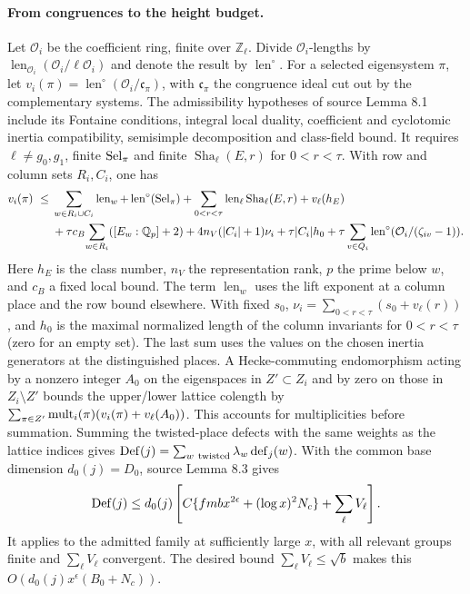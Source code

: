 \documentclass[letterpaper,11pt]{article}
\newcommand{\QQ}{\mathbb Q}
\newcommand{\ZZ}{\mathbb Z}
\newcommand{\Sha}{\operatorname{Sha}}
\newcommand{\len}{\operatorname{len}}
\begin{document}
\paragraph{From congruences to the height budget.}
Let \(\mathcal O_i\) be the coefficient ring, finite over \(\ZZ_\ell\). Divide \(\mathcal O_i\)-lengths by \(\len_{\mathcal O_i}(\mathcal O_i/\ell\mathcal O_i)\) and denote the result by \(\len^\circ\). For a selected eigensystem \(\pi\), let \(v_i(\pi)=\len^\circ(\mathcal O_i/\mathfrak c_\pi)\), with \(\mathfrak c_\pi\) the congruence ideal cut out by the complementary systems. The admissibility hypotheses of source Lemma 8.1 include its Fontaine conditions, integral local duality, coefficient and cyclotomic inertia compatibility, semisimple decomposition and class-field bound. It requires \(\ell\ne g_0,g_1\), finite \({\rm Sel}_\pi\) and finite \(\Sha_\ell(E,r)\) for \(0<r<\tau\). With row and column sets \(R_i,C_i\), one has
\begin{align*}
 v_i(\pi)\ \le{}&
 \sum_{w\in R_i\cup C_i}\len_w+\len^\circ({\rm Sel}_\pi)
 +\sum_{0<r<\tau}\len_\ell\Sha_\ell(E,r)+v_\ell(h_E)\\
 &+\tau c_B\!\sum_{w\in R_i}([E_w:\QQ_p]+2)
 +4n_V(|C_i|+1)\nu_i+\tau |C_i|h_0
 +\tau\sum_{v\in Q_i}\len^\circ(\mathcal O_i/(\zeta_{iv}-1)).
\end{align*}
Here \(h_E\) is the class number, \(n_V\) the representation rank, \(p\) the prime below \(w\), and \(c_B\) a fixed local bound. The term \(\len_w\) uses the lift exponent at a column place and the row bound elsewhere. With fixed \(s_0\), \(\nu_i=\sum_{0<r<\tau}(s_0+v_\ell(r))\), and \(h_0\) is the maximal normalized length of the column invariants for \(0<r<\tau\) (zero for an empty set). The last sum uses the values on the chosen inertia generators at the distinguished places. A Hecke-commuting endomorphism acting by a nonzero integer \(A_0\) on the eigenspaces in \(Z'\subset Z_i\) and by zero on those in \(Z_i\setminus Z'\) bounds the upper/lower lattice colength by
\(\sum_{\pi\in Z'}{\rm mult}_i(\pi)(v_i(\pi)+v_\ell(A_0))\). This accounts for multiplicities before summation. Summing the twisted-place defects with the same weights as the lattice indices gives \({\rm Def}(j)=\sum_{w\ {\rm twisted}}\lambda_w\,{\rm def}_j(w)\). With the common base dimension \(d_0(j)=D_0\), source Lemma 8.3 gives
\[
 {\rm Def}(j)\le d_0(j)\left[C\{fmbx^{2\epsilon}+(\log x)^2N_c\}+\sum_\ell V_\ell\right].
\]
It applies to the admitted family at sufficiently large \(x\), with all relevant groups finite and \(\sum_\ell V_\ell\) convergent. The desired bound \(\sum_\ell V_\ell\le\sqrt b\) makes this \(O(d_0(j)x^\epsilon(B_0+N_c))\).
\end{document}
